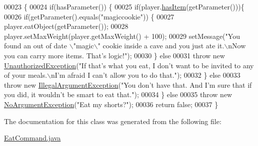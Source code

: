 \begin{DoxyCode}
00023                                                                                                            
               \{
00024         \textcolor{keywordflow}{if}(hasParameter()) \{
00025             \textcolor{keywordflow}{if}(player.\hyperlink{classPlayer_a90cb3f05b491eaed668fe54b9258b755}{hasItem}(getParameter()))\{
00026                 \textcolor{keywordflow}{if}(getParameter().equals(\textcolor{stringliteral}{"magiccookie"})) \{
00027                     player.eatObject(getParameter());
00028                     player.setMaxWeight(player.getMaxWeight() + 100);
00029                     setMessage(\textcolor{stringliteral}{"You found an out of date \(\backslash\)"magic\(\backslash\)" cookie inside a cave and you just ate
       it.\(\backslash\)nNow you can carry more items. That's logic!"});
00030                 \} \textcolor{keywordflow}{else}
00031                     \textcolor{keywordflow}{throw} \textcolor{keyword}{new} \hyperlink{classUnauthorizedException}{UnauthorizedException}(\textcolor{stringliteral}{"If that's what you eat, I don't
       want to be invited to any of your meals.\(\backslash\)nI'm afraid I can't allow you to do that."});
00032             \} \textcolor{keywordflow}{else} 
00033                 \textcolor{keywordflow}{throw} \textcolor{keyword}{new} \hyperlink{classIllegalArgumentException}{IllegalArgumentException}(\textcolor{stringliteral}{"You don't have that. And I'm
       sure that if you did, it wouldn't be smart to eat that."});
00034         \} \textcolor{keywordflow}{else} 
00035             \textcolor{keywordflow}{throw} \textcolor{keyword}{new} \hyperlink{classNoArgumentException}{NoArgumentException}(\textcolor{stringliteral}{"Eat my shorts?"});
00036         \textcolor{keywordflow}{return} \textcolor{keyword}{false};
00037     \}
\end{DoxyCode}


The documentation for this class was generated from the following file\-:\begin{DoxyCompactItemize}
\item 
\hyperlink{EatCommand_8java}{Eat\-Command.\-java}\end{DoxyCompactItemize}
